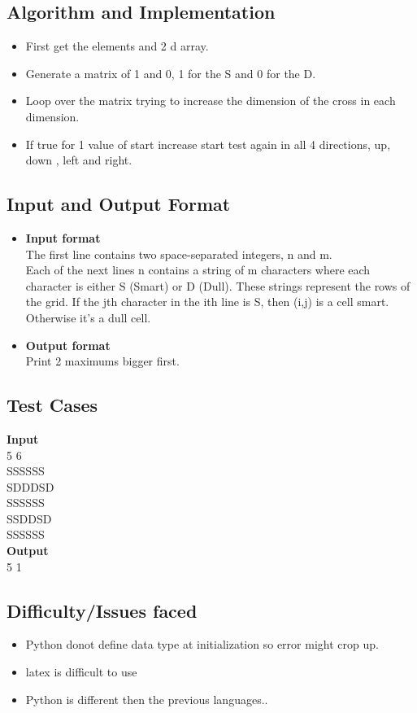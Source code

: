 \documentclass[12pt]{article}
\begin{document}
{\subsection{Algorithm and Implementation}
{\begin{itemize}
\item First get the elements and 2 d array.
\item Generate a matrix of 1 and 0, 1 for the S and 0 for the D.
\item Loop over the matrix trying to increase the dimension of the cross in each dimension.
\item If true for 1 value of start increase start test again in all 4 directions, up, down , left and right.
\end{itemize}
}
\subsection{Input and Output Format}
{
\begin{itemize}

\item \textbf{Input format} \\
The first line contains two space-separated integers,  n and m.\\
Each of the next  lines n contains a string of  m characters where each character is either S (Smart) or D (Dull). These strings represent the rows of the grid. If the jth character in the ith  line is S, then  (i,j) is a  cell smart. Otherwise it's a  dull cell.

\item \textbf{Output format} \\
Print 2 maximums bigger first.\\
\end{itemize}
}
\subsection{Test Cases}
{\textbf{Input} \\
5 6\\
SSSSSS\\
SDDDSD\\
SSSSSS\\
SSDDSD\\
SSSSSS\\
\textbf{Output}\\
5 1\\
}
\subsection{Difficulty/Issues faced}
{
\begin{itemize}
\item Python donot define data type at initialization so error might crop up.
\item latex is difficult to use
\item Python is different then the previous languages..
\end{itemize}
}
}
\end{document}
